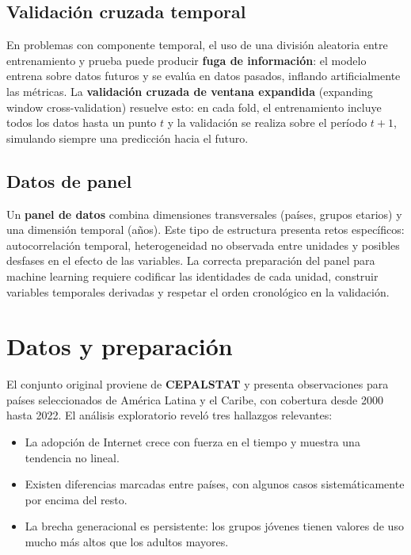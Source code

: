 \documentclass[12pt,a4paper]{article}
\begin{document}
\subsection{Validaci\'on cruzada temporal}

En problemas con componente temporal, el uso de una divisi\'on aleatoria entre entrenamiento y prueba puede producir \textbf{fuga de informaci\'on}: el modelo entrena sobre datos futuros y se eval\'ua en datos pasados, inflando artificialmente las m\'etricas. La \textbf{validaci\'on cruzada de ventana expandida} (expanding window cross-validation) resuelve esto: en cada fold, el entrenamiento incluye todos los datos hasta un punto $t$ y la validaci\'on se realiza sobre el per\'iodo $t+1$, simulando siempre una predicci\'on hacia el futuro.

\subsection{Datos de panel}

Un \textbf{panel de datos} combina dimensiones transversales (pa\'ises, grupos etarios) y una dimensi\'on temporal (a\~nos). Este tipo de estructura presenta retos espec\'ificos: autocorrelaci\'on temporal, heterogeneidad no observada entre unidades y posibles desfases en el efecto de las variables. La correcta preparaci\'on del panel para machine learning requiere codificar las identidades de cada unidad, construir variables temporales derivadas y respetar el orden cronol\'ogico en la validaci\'on.

\section{Datos y preparaci\'on}

El conjunto original proviene de \textbf{CEPALSTAT} y presenta observaciones para pa\'ises seleccionados de Am\'erica Latina y el Caribe, con cobertura desde 2000 hasta 2022. El an\'alisis exploratorio revel\'o tres hallazgos relevantes:

\begin{itemize}
    \item La adopci\'on de Internet crece con fuerza en el tiempo y muestra una tendencia no lineal.
    \item Existen diferencias marcadas entre pa\'ises, con algunos casos sistem\'aticamente por encima del resto.
    \item La brecha generacional es persistente: los grupos j\'ovenes tienen valores de uso mucho m\'as altos que los adultos mayores.
\end{itemize}
\end{document}
